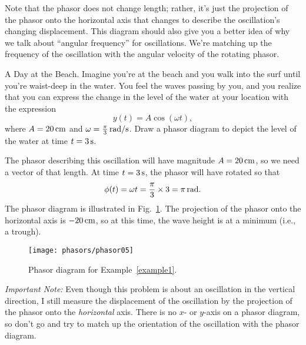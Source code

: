 Note that the phasor does not change length; rather, it's just the
projection of the phasor onto the horizontal axis that changes to
describe the oscillation's changing displacement.  This diagram should
also give you a better idea of why we talk about ``angular frequency''
for oscillations. We're matching up the frequency of the oscillation
with the angular velocity of the rotating phasor.

\begin{example}{A Day at the Beach.} 
\label{example1}
Imagine you're at the beach and you walk into the surf
until you're waist-deep in the water. You feel the waves passing by
you, and you realize that you can express the change in the level of
the water at your location with the expression
\begin{equation}
y(t) = A\cos{(\omega t)},
\end{equation} 
where $A = 20\,\mbox{cm}$ and $\omega = \frac{\pi}{3}\,\mbox{rad/s}$.
Draw a phasor diagram to depict the level of the water at time
$t = 3\,\mbox{s}$.
\begin{solution}
The phasor describing this oscillation will have magnitude $A = 20\,\mbox{cm}$,
so we need a vector of that length. At time $t = 3\,\mbox{s}$, the
phasor will have rotated so that
\begin{equation}
\phi (t) = \omega t = \frac{\pi}{3}\times 3 = \pi\,\mbox{rad}. 
\end{equation}
The phasor diagram is illustrated in Fig.~\ref{fig:phasor05}. 
\noindent The projection of the phasor onto the horizontal axis is
$-20\,\mbox{cm}$, so at this time, the wave height is at a minimum
(i.e., a trough).

\begin{figure}
\begin{center}
 \texttt{[image: phasors/phasor05]} 
\caption{Phasor diagram for Example~\ref{example1}.
\label{fig:phasor05}}
\end{center}
\end{figure}


{\em Important Note:} Even though this problem is about an oscillation
in the vertical direction, I still measure the displacement of the
oscillation by the projection of the phasor onto the {\em horizontal}
axis. There is no $x$-  or $y$-axis on a phasor diagram, so don't go
and try to match up the orientation of the oscillation with the phasor
diagram.
\end{solution}
\end{example}

